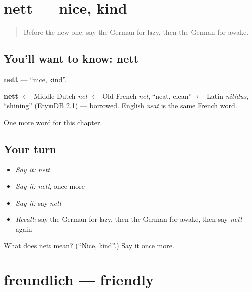 \section[nett]{nett — nice, kind}

\label{lesson:GE-C132-nett}



\begin{quote}
Before the new one: say the German for lazy, then the German for awake.
\end{quote}

\subsection*{You'll want to know: nett}
\textbf{nett} — \textquotedblleft{}nice, kind\textquotedblright{}.

\begin{cousinweb}
\textbf{nett} $\leftarrow$ Middle Dutch \emph{net} $\leftarrow$ Old French \emph{net}, \textquotedblleft{}neat, clean\textquotedblright{} $\leftarrow$ Latin \emph{nitidus}, \textquotedblleft{}shining\textquotedblright{} (EtymDB 2.1) — borrowed. English \emph{neat} is the same French word.
\end{cousinweb}

\begin{grammarlens}[title={What you've built}]
One more word for this chapter.
\end{grammarlens}

\subsection*{Your turn}
\begin{itemize}
\raggedright
  \item \emph{Say it:} \emph{nett}
  \item \emph{Say it:} \emph{nett}, once more
  \item \emph{Say it:} say \emph{nett}
  \item \emph{Recall:} say the German for lazy, then the German for awake, then say \emph{nett} again
\end{itemize}

\begin{tcolorbox}[breakable,colback=teal!4,colframe=teal!35!black,title={Before you move on}]
What does nett mean? (\textquotedblleft{}Nice, kind\textquotedblright{}.) Say it once more.
\end{tcolorbox}
\section[freundlich]{freundlich — friendly}

